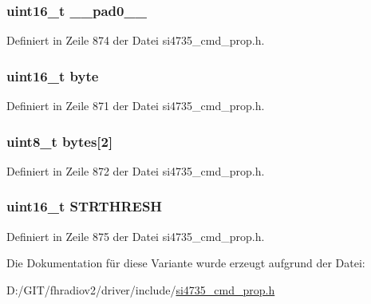 \subsubsection[{\+\_\+\+\_\+pad0\+\_\+\+\_\+}]{\setlength{\rightskip}{0pt plus 5cm}uint16\+\_\+t \+\_\+\+\_\+pad0\+\_\+\+\_\+}\label{unionfm__blend__snr__stereo__thres_a77132c2c26a75f5b8751b235cda23828}


Definiert in Zeile 874 der Datei si4735\+\_\+cmd\+\_\+prop.\+h.

\hypertarget{unionfm__blend__snr__stereo__thres_ab0549c1b5ea980a02e7eab77e21fea49}{}
\subsubsection[{byte}]{\setlength{\rightskip}{0pt plus 5cm}uint16\+\_\+t byte}\label{unionfm__blend__snr__stereo__thres_ab0549c1b5ea980a02e7eab77e21fea49}


Definiert in Zeile 871 der Datei si4735\+\_\+cmd\+\_\+prop.\+h.

\hypertarget{unionfm__blend__snr__stereo__thres_a46e4c05d20a047ec169f60d3167e912e}{}
\subsubsection[{bytes}]{\setlength{\rightskip}{0pt plus 5cm}uint8\+\_\+t bytes\mbox{[}2\mbox{]}}\label{unionfm__blend__snr__stereo__thres_a46e4c05d20a047ec169f60d3167e912e}


Definiert in Zeile 872 der Datei si4735\+\_\+cmd\+\_\+prop.\+h.

\hypertarget{unionfm__blend__snr__stereo__thres_ae59cc6ed2c20ceb75c5065984e1751d1}{}
\subsubsection[{S\+T\+R\+T\+H\+R\+E\+S\+H}]{\setlength{\rightskip}{0pt plus 5cm}uint16\+\_\+t S\+T\+R\+T\+H\+R\+E\+S\+H}\label{unionfm__blend__snr__stereo__thres_ae59cc6ed2c20ceb75c5065984e1751d1}


Definiert in Zeile 875 der Datei si4735\+\_\+cmd\+\_\+prop.\+h.



Die Dokumentation für diese Variante wurde erzeugt aufgrund der Datei\+:\begin{DoxyCompactItemize}
\item 
D\+:/\+G\+I\+T/fhradiov2/driver/include/\hyperlink{si4735__cmd__prop_8h}{si4735\+\_\+cmd\+\_\+prop.\+h}\end{DoxyCompactItemize}
